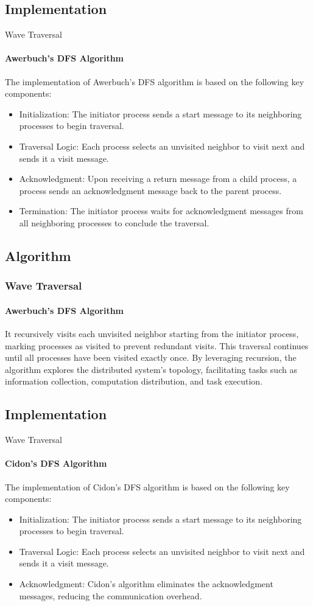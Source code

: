 \documentclass[11pt]{beamer}              %
\begin{document}
\subsection{Implementation}
\begin{frame}{Wave Traversal}
\framesubtitle{Awerbuch's DFS Algorithm}
The implementation of Awerbuch's DFS algorithm is based on the following key components:
\begin{itemize}
  \item Initialization: The initiator process sends a start message to its neighboring processes to begin traversal.
  \item Traversal Logic: Each process selects an unvisited neighbor to visit next and sends it a visit message.
  \item Acknowledgment: Upon receiving a return message from a child process, a process sends an acknowledgment message back to the parent process.
  \item Termination: The initiator process waits for acknowledgment messages from all neighboring processes to conclude the traversal.
\end{itemize}
\end{frame}


\subsection{Algorithm}

\begin{frame}
\frametitle{Wave Traversal}
\framesubtitle{Awerbuch's DFS Algorithm}
It recursively visits each unvisited neighbor starting from the initiator process, marking processes as visited to prevent redundant visits.
This traversal continues until all processes have been visited exactly once.
By leveraging recursion, the algorithm explores the distributed system's topology, facilitating tasks such as information collection, computation distribution, and task execution.
\end{frame}


\subsection{Implementation}
\begin{frame}{Wave Traversal}
\framesubtitle{Cidon's DFS Algorithm}
The implementation of Cidon's DFS algorithm is based on the following key components:
\begin{itemize}
  \item Initialization: The initiator process sends a start message to its neighboring processes to begin traversal.
  \item Traversal Logic: Each process selects an unvisited neighbor to visit next and sends it a visit message.
  \item Acknowledgment: Cidon's algorithm eliminates the acknowledgment messages, reducing the communication overhead.

\end{itemize}

\end{frame}
\end{document}
